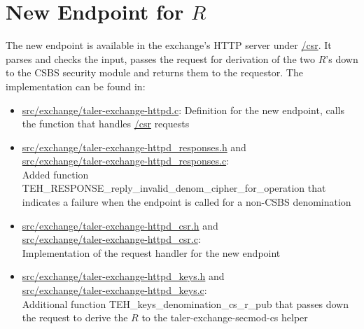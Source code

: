\section{New Endpoint for $R$}
The new endpoint is available in the exchange's HTTP server under \url{/csr}.
It parses and checks the input, passes the request for derivation of the two $ R $'s down to the \gls{CSBS} security module and returns them to the requestor.
The implementation can be found in:
\begin{itemize}
    \item \url{src/exchange/taler-exchange-httpd.c}:
    Definition for the new endpoint, calls the function that handles \url{/csr} requests
    \item \url{src/exchange/taler-exchange-httpd_responses.h} and \\
    \url{src/exchange/taler-exchange-httpd_responses.c}: \\
    Added function TEH\_RESPONSE\_reply\_invalid\_denom\_cipher\_for\_operation that indicates a failure when the endpoint is called for a non-\gls{CSBS} denomination
    \item \url{src/exchange/taler-exchange-httpd_csr.h} and \\
    \url{src/exchange/taler-exchange-httpd_csr.c}: \\
    Implementation of the request handler for the new endpoint
    \item \url{src/exchange/taler-exchange-httpd_keys.h} and \\
    \url{src/exchange/taler-exchange-httpd_keys.c}: \\
    Additional function TEH\_keys\_denomination\_cs\_r\_pub that passes down the request to derive the $ R $ to the taler-exchange-secmod-cs helper
\end{itemize}

